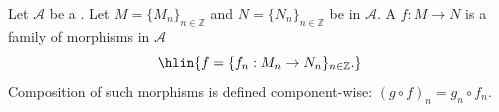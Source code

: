 \begin{definition} \label{definition:morphism_of_graded_objects_in_an_abelian_category}
    Let $\mathcal{A}$ be a . Let $M = \{M_n\}_{n \in \mathbb{Z}}$ and $N = \{N_n\}_{n \in \mathbb{Z}}$ be  in $\mathcal{A}$.
    A  $f: M \to N$ is a family of morphisms in $\mathcal{A}$
    $$\hlin{f = \{f_n: M_n \to N_n\}_{n \in \mathbb{Z}}.}$$
    Composition of such morphisms is defined component-wise: $(g \circ f)_n = g_n \circ f_n$.
\end{definition}